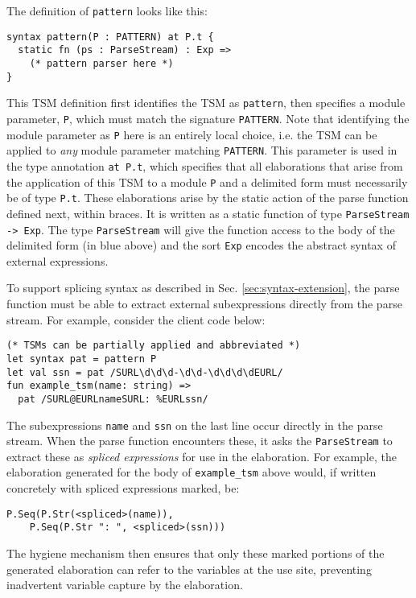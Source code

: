 \documentclass[preprint]{sigplanconf}
\begin{document}
The definition of \lstinline{pattern} looks like this:
\begin{lstlisting}[numbers=none]
syntax pattern(P : PATTERN) at P.t {
  static fn (ps : ParseStream) : Exp => 
    (* pattern parser here *)
}
\end{lstlisting}
This TSM definition first identifies the TSM as \lstinline{pattern}, then specifies a module parameter, \lstinline{P}, which must match the signature \lstinline{PATTERN}. Note that identifying the module parameter as \lstinline{P} here is an entirely local choice, i.e. the TSM can be applied to \emph{any} module parameter matching  \lstinline{PATTERN}. This parameter is used in the type annotation \lstinline{at P.t}, which specifies that all elaborations that arise from the application of this TSM to a module \lstinline{P} and a delimited form must necessarily be of type \lstinline{P.t}. These elaborations arise by the static action of the parse function defined next, within braces. It is written as a static function of type \lstinline{ParseStream -> Exp}. The type \lstinline{ParseStream} will give the function access to the {body} of the delimited form (in blue above) and the sort \lstinline{Exp}  encodes the abstract syntax of external expressions. %

To support splicing syntax as described in Sec. \ref{sec:syntax-extension}, the parse function must be able to extract external subexpressions directly from the parse stream. For example, consider the client code below:
\begin{lstlisting}[numbers=none]
(* TSMs can be partially applied and abbreviated *)
let syntax pat = pattern P
let val ssn = pat /SURL\d\d\d-\d\d-\d\d\d\dEURL/
fun example_tsm(name: string) => 
  pat /SURL@EURLnameSURL: %EURLssn/
\end{lstlisting}
The subexpressions \lstinline{name} and \lstinline{ssn} on the last line occur directly in the parse stream. When the parse function encounters these, it asks the \lstinline{ParseStream} to extract these as \emph{spliced expressions} for use in the elaboration. For example, the elaboration generated for the body of \lstinline{example_tsm} above would, if written concretely with spliced expressions marked, be:
\begin{lstlisting}[numbers=none]
P.Seq(P.Str(<spliced>(name)), 
	P.Seq(P.Str ": ", <spliced>(ssn)))
\end{lstlisting}
The hygiene mechanism then ensures that only these marked portions of the generated elaboration can refer to the variables at the use site, preventing inadvertent variable capture by the elaboration.
\end{document}
